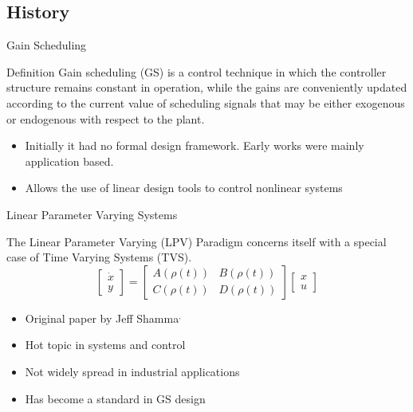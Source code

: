 
\subsection{History}
\begin{frame}{Gain Scheduling \autocite{Rugh2000}}
\begin{block}{Definition}
	Gain scheduling (GS) is a control technique in which the controller structure remains constant in operation, while the gains are conveniently updated according to the current value of scheduling signals that may be either exogenous or endogenous with respect to the plant. 
\end{block}

	\begin{itemize}
		\item Initially it had no formal design framework. Early works were mainly application based.
		\item Allows the use of linear design tools to control nonlinear systems
	\end{itemize}
\end{frame}


\begin{frame}{Linear Parameter Varying Systems}
\begin{block}{}
The Linear Parameter Varying (LPV) Paradigm concerns itself with a special case of Time Varying Systems (TVS). 
\begin{equation}  \label{eq:gen_LPV}
\begin{bmatrix}
\dot{x}\\
y
\end{bmatrix} = \begin{bmatrix}
A(\rho(t)) & B(\rho(t))\\
C(\rho(t)) & D(\rho(t))
\end{bmatrix}\begin{bmatrix}
x\\
u
\end{bmatrix}
\end{equation}
\end{block}

\begin{itemize}
	\item Original paper by Jeff Shamma\autocite{Shamma1988}$^{,}$\autocite{Shamma1990}
    \item Hot topic in systems and control
 	\item Not widely spread in industrial applications
    \item Has become a standard in GS design
\end{itemize}
\end{frame}

